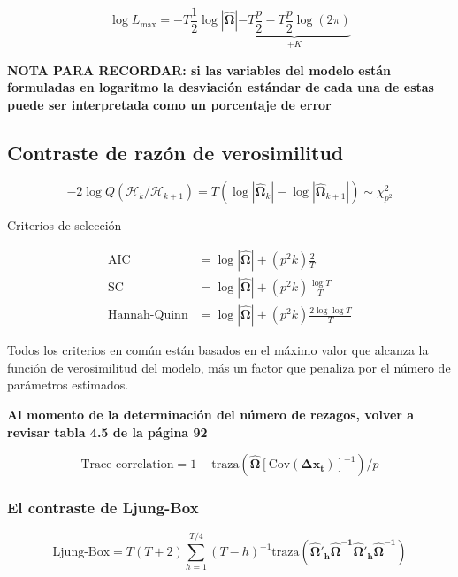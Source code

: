 \documentclass[12pt, twoside]{book}\usepackage[]{graphicx}\usepackage[]{color}
\numberwithin{equation}{section}
\numberwithin{theorem}{section}
\numberwithin{teorema}{section}
\numberwithin{defi}{section}
\numberwithin{prop}{section}
\numberwithin{defi}{section}
\theoremstyle{plain}
\begin{document}
\begin{equation}
\log L_{\max} = -T \frac{1}{2} \log |\boldsymbol{\hat{\Omega}}|\underbrace{-T\frac{p}{2}-T\frac{p}{2}\log(2\pi)}_{+K}
\end{equation}

\textbf{NOTA PARA RECORDAR: si las variables del modelo están formuladas en logaritmo la desviación estándar de cada una de estas puede ser interpretada como un porcentaje de error }


\subsection{Contraste de razón de verosimilitud}

\begin{equation}
  -2\log Q(\mathcal{H}_{k}/\mathcal{H}_{k+1}) =  T(\log|\boldsymbol{\hat{\Omega}}_{k}|-\log|\boldsymbol{\hat{\Omega}}_{k+1}|) \sim \chi^{2}_{p^{2}}
\end{equation}


Criterios de selección 

\begin{align}
\text{AIC} & = \log |\boldsymbol{\hat{\Omega}}|+(p^{2}k)\frac{2}{T} \\ 
\text{SC} & = \log|\boldsymbol{\hat{\Omega}}|+(p^{2}k)\frac{\log T}{T} \\ 
\text{Hannah-Quinn} & = \log|\boldsymbol{\hat{\Omega}}|+(p^{2}k)\frac{2\log \log T}{T}
\end{align}

Todos los criterios en común están basados en el máximo valor que alcanza la función de verosimilitud del modelo, más un factor que penaliza por el número de parámetros estimados. 

\textbf{
Al momento de la determinación del número de rezagos, volver a revisar tabla 4.5 de la página 92}

\begin{equation}
\text{Trace correlation} = 1-\text{traza}(\boldsymbol{\hat{\Omega}}[\text{Cov}(\mathbf{\Delta x_{t}})]^{-1})/p 
\end{equation}


\subsubsection{El contraste de Ljung-Box}

\begin{equation}
\text{Ljung-Box} = T(T+2)\sum_{h=1}^{T/4}(T-h)^{-1}\text{traza}(\boldsymbol{\hat{\Omega}'_{h}\hat{\Omega}^{-1}\hat{\Omega}'_{h}\hat{\Omega}^{-1}})
\end{equation}
\end{document}
